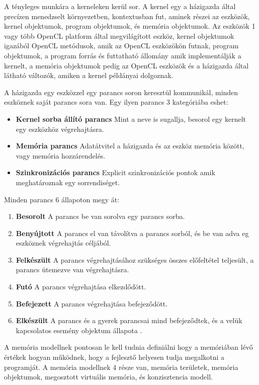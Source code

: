 A tényleges munkára a kerneleken kerül sor. A kernel egy a házigazda által precízen menedzselt környezetben, kontextusban fut, aminek részei az eszközök, kernel objektumok, program objektumok, és memória objektumok. Az eszközök 1 vagy több OpenCL platform által megvilágított eszköz, kernel objektumok igazából OpenCL metódusok, amik az OpenCL eszközökön futnak, program objektumok, a program forrás és futtatható állomány amik implementálják a kernelt, a memória objektumok pedig az OpenCL eszközök és a házigazda által látható változók, amiken a kernel példányai dolgoznak.

A házigazda egy eszközzel egy parancs soron keresztül kommunikál, minden eszköznek saját parancs sora van. Egy ilyen parancs 3 kategóriába eshet:
\begin{itemize}
\item\textbf{Kernel sorba állító parancs} Mint a neve is sugallja, besorol egy kernelt egy eszközhöz végrehajtásra.
\item\textbf{Memória parancs} Adatátvitel a házigazda és az eszköz memória között, vagy memória hozzárendelés.
\item\textbf{Szinkronizációs parancs} Explicit szinkronizációs pontok amik meghatároznak egy sorrendiséget.
\end{itemize}
Minden parancs 6 állapoton megy át:
\begin{enumerate}
\item\textbf{Besorolt} A parancs be van sorolva egy parancs sorba.
\item\textbf{Benyújtott} A parancs el van távolítva a parancs sorból, és be van adva eg eszköznek végrehajtás céljából.
\item\textbf{Felkészült} A parancs végrehajtásához szükséges összes előfeltétel teljesült, a parancs ütemezve van végrehajtásra.
\item\textbf{Futó} A parancs végrehajtása elkezdődött.
\item\textbf{Befejezett} A parancs végrehajtása befejeződött.
\item\textbf{Elkészült} A parancs és a gyerek parancsai mind befejeződtek, és a velük kapcsolatos esemény objektum állapota .
\end{enumerate}

A memória modellnek pontosan le kell tudnia definiálni hogy a memóriában lévő értékek hogyan működnek, hogy a fejlesztő helyesen tudja megalkotni a programját. A memória modellnek 4 része van, memória területek, memória objektumok, megosztott virtuális memória, és konzisztencia modell.

